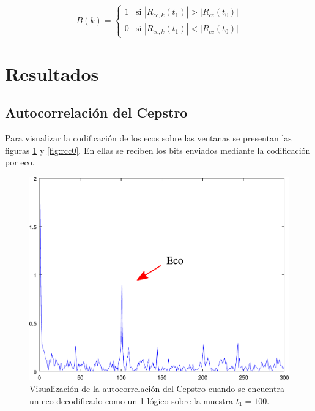 \documentclass[conference]{IEEEtran}
\begin{document}
\begin{equation}
B(k) = \begin{cases}
1 &\text{si $|R_{cc,k}(t_1)|>|R_{cc}(t_0)|$}\\
0 &\text{si $|R_{cc,k}(t_1)|<|R_{cc}(t_0)|$}
\end{cases}
\label{eq:bit}
\end{equation}

\section{Resultados}
\subsection{Autocorrelación del Cepstro}
Para visualizar la codificación de los ecos sobre las ventanas se presentan las figuras \ref{fig:rcc1} y \ref{fig:rcc0}. En ellas se reciben los bits enviados mediante la codificación por eco.

\begin{figure}
\centering
\includegraphics[scale=0.4]{rcc.pdf}
\caption{Visualización de la autocorrelación del Cepstro cuando se encuentra un eco decodificado como un 1 lógico sobre la muestra $t_1=100$.}
\label{fig:rcc1}
\end{figure}
\end{document}
